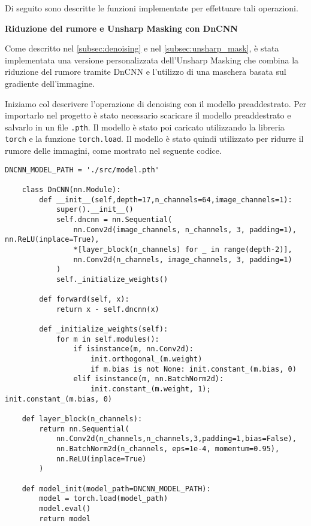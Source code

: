 Di seguito sono descritte le funzioni implementate per effettuare tali operazioni.

\textbf{Riduzione del rumore e Unsharp Masking con DnCNN}

Come descritto nel \cref{subsec:denoising} e nel \cref{subsec:unsharp_mask}, è stata implementata una versione personalizzata dell'Unsharp Masking che combina la riduzione del rumore tramite DnCNN e l'utilizzo di una maschera basata sul gradiente dell'immagine.

Iniziamo col descrivere l'operazione di denoising con il modello preaddestrato. Per importarlo nel progetto è stato necessario scaricare il modello preaddestrato e salvarlo in un file \texttt{.pth}. Il modello è stato poi caricato utilizzando la libreria \texttt{torch} e la funzione \texttt{torch.load}. Il modello è stato quindi utilizzato per ridurre il rumore delle immagini, come mostrato nel seguente codice.

\begin{lstlisting}[label={lst:dncnn}]
    DNCNN_MODEL_PATH = './src/model.pth'
    
    class DnCNN(nn.Module):
        def __init__(self,depth=17,n_channels=64,image_channels=1):
            super().__init__()
            self.dncnn = nn.Sequential(
                nn.Conv2d(image_channels, n_channels, 3, padding=1), nn.ReLU(inplace=True),
                *[layer_block(n_channels) for _ in range(depth-2)],
                nn.Conv2d(n_channels, image_channels, 3, padding=1)
            )
            self._initialize_weights()
    
        def forward(self, x):
            return x - self.dncnn(x)
    
        def _initialize_weights(self):
            for m in self.modules():
                if isinstance(m, nn.Conv2d):
                    init.orthogonal_(m.weight)
                    if m.bias is not None: init.constant_(m.bias, 0)
                elif isinstance(m, nn.BatchNorm2d):
                    init.constant_(m.weight, 1); init.constant_(m.bias, 0)
    
    def layer_block(n_channels):
        return nn.Sequential(
            nn.Conv2d(n_channels,n_channels,3,padding=1,bias=False),
            nn.BatchNorm2d(n_channels, eps=1e-4, momentum=0.95),
            nn.ReLU(inplace=True)
        )
    
    def model_init(model_path=DNCNN_MODEL_PATH):
        model = torch.load(model_path)
        model.eval()
        return model
\end{lstlisting}
    

